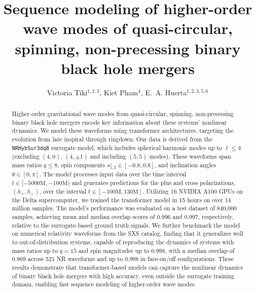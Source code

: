 \documentclass[12pt]{iopart}
\begin{document}
\title[Sequence modeling of higher-order wave modes of binary black hole mergers]{Sequence modeling of higher-order wave modes of quasi-circular, spinning, non-precessing binary black hole mergers}



\author{Victoria Tiki$^{1,2,3}$, Kiet Pham$^{4}$, E.~A. Huerta$^{1,2,3,5,6}$}

\address{$^1$ Data Science and Learning Division, Argonne National Laboratory, Lemont, Illinois 60439, USA}
\address{$^2$ Department of Physics, University of Illinois Urbana-Champaign, Urbana, Illinois 61801, USA}
\address{$^3$ NCSA, University of Illinois Urbana-Champaign, Urbana, Illinois 61801, USA}
\address{$^4$ School of Physics and Astronomy, University of Minnesota, 55455 Minnesota, USA}
\address{$^5$ Department of Computer Science, The University of Chicago, Chicago, Illinois 60637, USA}
\address{$^6$ Department of Astronomy, University of Illinois Urbana-Champaign, Urbana, Illinois 61801, USA}

\begin{abstract}
Higher-order gravitational wave modes from quasi-circular, spinning, non-precessing binary black hole mergers encode key information about these systems’ nonlinear dynamics. We model these waveforms using transformer architectures, targeting the evolution from late inspiral through ringdown. Our data is derived from the \texttt{NRHybSur3dq8} surrogate model, which includes spherical harmonic modes up to $\ell \leq 4$ (excluding $(4,0)$, $(4,\pm1)$ and including $(5,5)$ modes). These waveforms span mass ratios $q \leq 8$, spin components $s^z_{{1,2}} \in [-0.8, 0.8]$, and inclination angles $\theta \in [0, \pi]$. The model processes input data over the time interval $t \in [-5000\textrm{M}, -100\textrm{M})$ and generates predictions for the plus and cross polarizations, $(h_{+}, h_{\times})$, over the interval $t \in [-100\textrm{M}, 130\textrm{M}]$. Utilizing 16 NVIDIA A100 GPUs on the Delta supercomputer, we trained the transformer model in 15 hours on over 14 million samples.  The model's performance was evaluated on a test dataset of 840,000 samples, achieving mean and median overlap scores of 0.996 and 0.997, respectively, relative to the surrogate-based ground truth signals. We further benchmark the model on numerical relativity waveforms from the SXS catalog, finding that it generalizes well to out-of-distribution systems, capable of reproducing the dynamics of systems with mass ratios up to $q=15$ and spin magnitudes up to 0.998, with a median overlap of 0.969 across 521 NR waveforms and up to 0.998 in face-on/off configurations. These results demonstrate that transformer-based models can capture the nonlinear dynamics of binary black hole mergers with high accuracy, even outside the surrogate training domain, enabling fast sequence modeling of higher-order wave modes.
\end{abstract}
\end{document}
